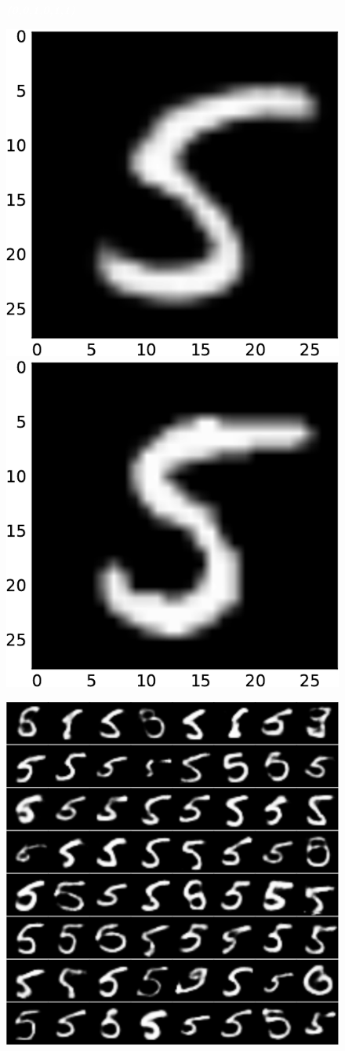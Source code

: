 \documentclass[xcolor={usenames,dvipsnames,svgnames}, compress]{beamer}
\newcommand{\highlighttext}[2][yellow]{{\colorbox{#1}{\textcolor{white}{#2}}}}
\begin{document}
\begin{frame}[t]
\begin{figure}[t]
\begin{minipage}{0.18\linewidth}
    \highlighttext[olive4]{\scriptsize\textbf{\emph{(0,0,1,0,1,1)}}}
\end{minipage}\hspace{5pt}\begin{minipage}{0.2\linewidth}
\vspace{-13pt}
    \includegraphics[width=0.47\linewidth]{figures/mpe-15}\\
    \includegraphics[width=0.47\linewidth]{figures/nn-sample-15}
\end{minipage}\hspace{-30pt}\begin{minipage}{0.18\linewidth}
    \includegraphics[width=1.0\columnwidth]{figures/cond-samples-15}\\

\end{minipage}
\end{figure}
\end{frame}
\end{document}
